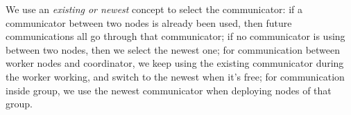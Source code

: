 We use an \emph{existing or newest} concept to select the communicator: if a communicator between two nodes is already been used, then future communications all go through that communicator; if no communicator is using between two nodes, then we select the newest one; for communication between worker nodes and coordinator, we keep using the existing communicator during the worker working, and switch to the newest when it's free; for communication inside group, we use the newest communicator when deploying nodes of that group.
